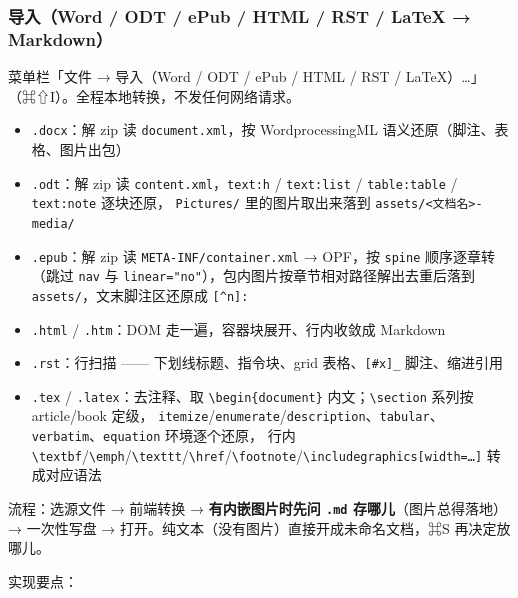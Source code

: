\documentclass[11pt,a4paper]{ctexart}
\begin{document}
\subsubsection{导入（Word / ODT / ePub / HTML / RST / LaTeX → Markdown）}

菜单栏「文件 → 导入（Word / ODT / ePub / HTML / RST / LaTeX）…」（⌘⇧I）。全程本地转换，不发任何网络请求。

\begin{itemize}
\item \texttt{.docx}：解 zip 读 \texttt{document.xml}，按 WordprocessingML 语义还原（脚注、表格、图片出包）
\item \texttt{.odt}：解 zip 读 \texttt{content.xml}，\texttt{text:h} / \texttt{text:list} / \texttt{table:table} / \texttt{text:note} 逐块还原，
\texttt{Pictures/} 里的图片取出来落到 \texttt{assets/\textless{}文档名\textgreater{}-media/}
\item \texttt{.epub}：解 zip 读 \texttt{META-INF/container.xml} → OPF，按 \texttt{spine} 顺序逐章转（跳过 \texttt{nav} 与
\texttt{linear="no"}），包内图片按章节相对路径解出去重后落到 \texttt{assets/}，文末脚注区还原成 \texttt{[\textasciicircum{}n]:}
\item \texttt{.html} / \texttt{.htm}：DOM 走一遍，容器块展开、行内收敛成 Markdown
\item \texttt{.rst}：行扫描 —— 下划线标题、指令块、grid 表格、\texttt{[\#x]\_} 脚注、缩进引用
\item \texttt{.tex} / \texttt{.latex}：去注释、取 \texttt{\textbackslash{}begin\{document\}} 内文；\texttt{\textbackslash{}section} 系列按 article/book 定级，
\texttt{itemize}/\texttt{enumerate}/\texttt{description}、\texttt{tabular}、\texttt{verbatim}、\texttt{equation} 环境逐个还原，
行内 \texttt{\textbackslash{}textbf}/\texttt{\textbackslash{}emph}/\texttt{\textbackslash{}texttt}/\texttt{\textbackslash{}href}/\texttt{\textbackslash{}footnote}/\texttt{\textbackslash{}includegraphics[width=…]} 转成对应语法
\end{itemize}


流程：选源文件 → 前端转换 → \textbf{有内嵌图片时先问 \texttt{.md} 存哪儿}（图片总得落地）→
一次性写盘 → 打开。纯文本（没有图片）直接开成未命名文档，⌘S 再决定放哪儿。

实现要点：
\end{document}
